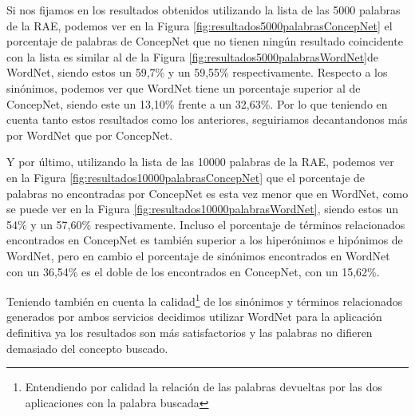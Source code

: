 Si nos fijamos en los resultados obtenidos utilizando la lista de las 5000 palabras de la RAE, podemos ver en la Figura \ref{fig:resultados5000palabrasConcepNet} el porcentaje de palabras de ConcepNet que no tienen ningún resultado coincidente con la lista es similar al de la Figura \ref{fig:resultados5000palabrasWordNet}de WordNet, siendo estos un 59,7\% y un 59,55\% respectivamente. Respecto a los sinónimos, podemos ver que WordNet tiene un porcentaje superior al de ConcepNet, siendo este un 13,10\% frente a un 32,63\%. Por lo que teniendo en cuenta tanto estos resultados como los anteriores, seguiriamos decantandonos más por WordNet que por ConcepNet.

Y por último, utilizando la lista de las 10000 palabras de la RAE, podemos ver en la Figura \ref{fig:resultados10000palabrasConcepNet} que el porcentaje de palabras no encontradas por ConcepNet es esta vez menor que en WordNet, como se puede ver en la Figura \ref{fig:resultados10000palabrasWordNet}, siendo estos un 54\% y un 57,60\% respectivamente. Incluso el porcentaje de términos relacionados encontrados en ConcepNet es también superior a los hiperónimos e hipónimos de WordNet, pero en cambio el porcentaje de sinónimos encontrados en WordNet con un 36,54\% es el doble de los encontrados en ConcepNet, con un 15,62\%.

Teniendo también en cuenta la calidad\footnote{Entendiendo por calidad la relación de las palabras devueltas por las dos aplicaciones con la palabra buscada} de los sinónimos y términos relacionados generados por ambos servicios decidimos utilizar WordNet para la aplicación definitiva ya los resultados son más satisfactorios y las palabras no difieren demasiado del concepto buscado.




